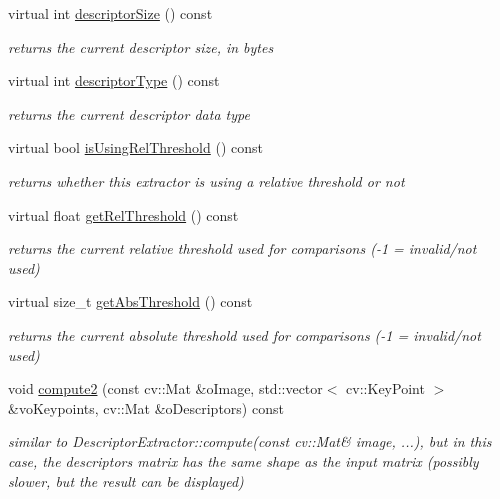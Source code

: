 \begin{DoxyCompactItemize}
virtual int \mbox{\hyperlink{class_l_b_s_p_afc7aa065fa562edd2b16b766910e7806}{descriptor\+Size}} () const
\begin{DoxyCompactList}\small\item\em returns the current descriptor size, in bytes \end{DoxyCompactList}\item 
virtual int \mbox{\hyperlink{class_l_b_s_p_a36803a3126c171c945dcb35a1d43f421}{descriptor\+Type}} () const
\begin{DoxyCompactList}\small\item\em returns the current descriptor data type \end{DoxyCompactList}\item 
virtual bool \mbox{\hyperlink{class_l_b_s_p_a1f75012723a8990ea7b9f74d3293dbe6}{is\+Using\+Rel\+Threshold}} () const
\begin{DoxyCompactList}\small\item\em returns whether this extractor is using a relative threshold or not \end{DoxyCompactList}\item 
virtual float \mbox{\hyperlink{class_l_b_s_p_acf999adf45d5e425d28b00ace6c928a4}{get\+Rel\+Threshold}} () const
\begin{DoxyCompactList}\small\item\em returns the current relative threshold used for comparisons (-\/1 = invalid/not used) \end{DoxyCompactList}\item 
virtual size\+\_\+t \mbox{\hyperlink{class_l_b_s_p_a6412e6797415eaf34def8ec7a92dc7ab}{get\+Abs\+Threshold}} () const
\begin{DoxyCompactList}\small\item\em returns the current absolute threshold used for comparisons (-\/1 = invalid/not used) \end{DoxyCompactList}\item 
void \mbox{\hyperlink{class_l_b_s_p_ab61148341758dbc004660761bca04f84}{compute2}} (const cv\+::\+Mat \&o\+Image, std\+::vector$<$ cv\+::\+Key\+Point $>$ \&vo\+Keypoints, cv\+::\+Mat \&o\+Descriptors) const
\begin{DoxyCompactList}\small\item\em similar to Descriptor\+Extractor\+::compute(const cv\+::\+Mat\& image, ...), but in this case, the descriptors matrix has the same shape as the input matrix (possibly slower, but the result can be displayed) \end{DoxyCompactList}\item 

\end{DoxyCompactItemize}
